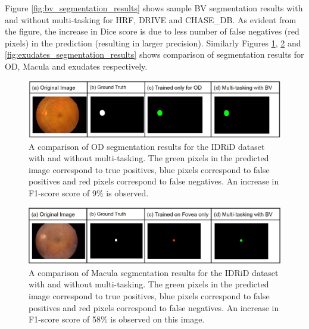 \documentclass[utf8]{FrontiersinHarvard} %
\begin{document}
Figure \ref{fig:bv_segmentation_results} shows  sample BV segmentation results with and without multi-tasking for HRF, DRIVE and CHASE\_DB. As evident from the figure, the increase in Dice score is due to less number of false negatives (red pixels) in the prediction (resulting in larger precision). Similarly Figures \ref{fig:od_segmentation_results}, \ref{fig:fovea_segmentation_results} and \ref{fig:exudates_segmentation_results} shows comparison of segmentation results for OD, Macula and exudates respectively.

\begin{figure}[h!]
\begin{center}
\includegraphics[width=15cm]{images/od_results.jpg}%
\end{center}
\caption{A comparison of OD segmentation results for the IDRiD dataset with and without multi-tasking. The green pixels in the predicted image correspond to true positives, blue pixels correspond to false positives and  red pixels correspond to false negatives. An increase in F1-score score of 9\% is observed.}

\label{fig:od_segmentation_results}
\end{figure}

\begin{figure}[h!]
\begin{center}
\includegraphics[width=15cm]{images/fovea_results.jpg}%
\end{center}
\caption{A comparison of Macula segmentation results for the IDRiD dataset with and without multi-tasking. The green pixels in the predicted image correspond to true positives, blue pixels correspond to false positives and  red pixels correspond to false negatives. An increase in F1-score score of 58\% is observed on this image.}
\label{fig:fovea_segmentation_results}
\end{figure}
\end{document}

